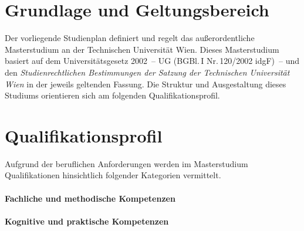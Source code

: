 
\newcommand*\Markierung{Lehrgang}
\newcommand*\Studienart{außerordentliche Masterstudium}
\newcommand*\ArtikelAkkusativStudienart{das}


\DECKBLATT

\tableofcontents
\clearpage

\section{Grundlage und Geltungsbereich}\label{sec:GG}

Der vorliegende Studienplan definiert und regelt das
außerordentliche Masterstudium \emph{} 
an der Technischen Universität Wien. 
Dieses Masterstudium basiert auf dem Universitätsgesetz 
2002~-- UG (BGBl.\,I Nr.\,120/2002 idgF)~-- und den 
\emph{Studienrechtlichen Bestimmungen der Satzung der 
Technischen Universität Wien} in der jeweils geltenden Fassung. 
Die Struktur und Ausgestaltung dieses Studiums orientieren
sich am folgenden Qualifikationsprofil.

\section{Qualifikationsprofil}\label{sec:QP}

\newcommand*\QPIntro{%
Das außerordentliche Masterstudium \emph{\VAR{Titel}} vermittelt eine vertiefte, 
wissenschaftlich und methodisch hochwertige, auf dauerhaftes Wissen ausgerichtete 
Bildung, welche die Absolvent\_innen höher qualifiziert  sowie für eine Beschäftigung 
in beispielsweise folgenden Tätigkeitsbereichen befähigt und 
international konkurrenzfähig macht:
%
}


%

Aufgrund der beruflichen Anforderungen werden im Masterstudium
\emph{} Qualifikationen hinsichtlich folgender Kategorien
vermittelt.

\paragraph{Fachliche und methodische Kompetenzen}

\paragraph{Kognitive und praktische Kompetenzen}

